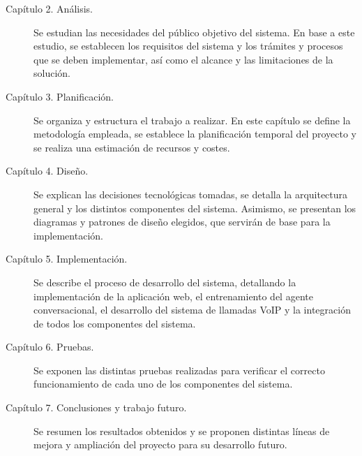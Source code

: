     \begin{description}
        \item[Capítulo 2. Análisis.] Se estudian las necesidades del público objetivo del sistema. 
        En base a este estudio, se establecen los requisitos del sistema y los trámites y procesos que se deben implementar, así como el alcance y las limitaciones de la solución.

        \item[Capítulo 3. Planificación.] Se organiza y estructura el trabajo a realizar. 
        En este capítulo se define la metodología empleada, se establece la planificación temporal del proyecto y se realiza una estimación de recursos y costes.

        \item[Capítulo 4. Diseño.] Se explican las decisiones tecnológicas tomadas, se detalla la arquitectura general y los distintos componentes del sistema. 
        Asimismo, se presentan los diagramas y patrones de diseño elegidos, que servirán de base para la implementación.

        \item[Capítulo 5. Implementación.] Se describe el proceso de desarrollo del sistema, detallando la implementación de la aplicación web, el entrenamiento del agente conversacional, el desarrollo del sistema de llamadas VoIP y la integración de todos los componentes del sistema.

        \item[Capítulo 6. Pruebas.] Se exponen las distintas pruebas realizadas para verificar el correcto funcionamiento de cada uno de los componentes del sistema.
        
        \item[Capítulo 7. Conclusiones y trabajo futuro.] Se resumen los resultados obtenidos y se proponen distintas líneas de mejora y ampliación del proyecto para su desarrollo futuro.
    \end{description}
